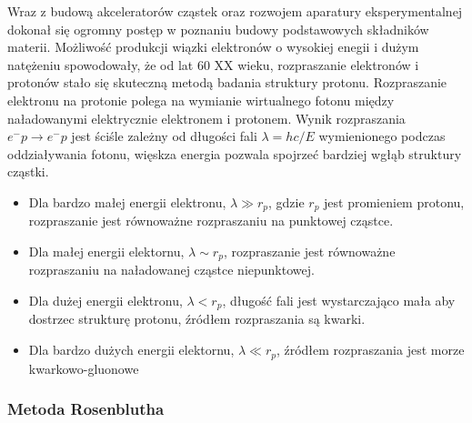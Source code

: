 \documentclass[11pt]{book}
\theoremstyle{definition}
\begin{document}
Wraz z budową akceleratorów cząstek oraz rozwojem aparatury eksperymentalnej dokonał się ogromny postęp w poznaniu budowy podstawowych składników materii. Możliwość produkcji wiązki elektronów o wysokiej enegii i dużym natężeniu spowodowały, że od lat 60 XX wieku, rozpraszanie elektronów i protonów stało się skuteczną metodą badania struktury protonu.
%
Rozpraszanie elektronu na protonie polega na wymianie wirtualnego fotonu między naładowanymi elektrycznie elektronem i protonem. Wynik rozpraszania $e^- p\rightarrow e^- p$ jest ściśle zależny od długości fali $\lambda = hc / E$ wymienionego podczas oddziaływania fotonu, więskza energia pozwala spojrzeć bardziej wgłąb struktury cząstki.
\begin{itemize}
	\item Dla bardzo małej energii elektronu, $\lambda \gg r_p$, gdzie $r_p$ jest promieniem protonu, rozpraszanie jest równoważne rozpraszaniu na punktowej cząstce.
	\item Dla małej energii elektornu, $\lambda \sim r_p$, rozpraszanie jest równoważne rozpraszaniu na naładowanej cząstce niepunktowej.
	\item Dla dużej energii elektronu, $\lambda < r_p$, długość fali jest wystarczająco mała aby dostrzec strukturę protonu, źródłem rozpraszania są kwarki.
	\item Dla bardzo dużych energii elektornu, $\lambda \ll r_p$, źródłem rozpraszania jest morze kwarkowo-gluonowe
\end{itemize}

\subsubsection{Metoda Rosenblutha}
\end{document}
